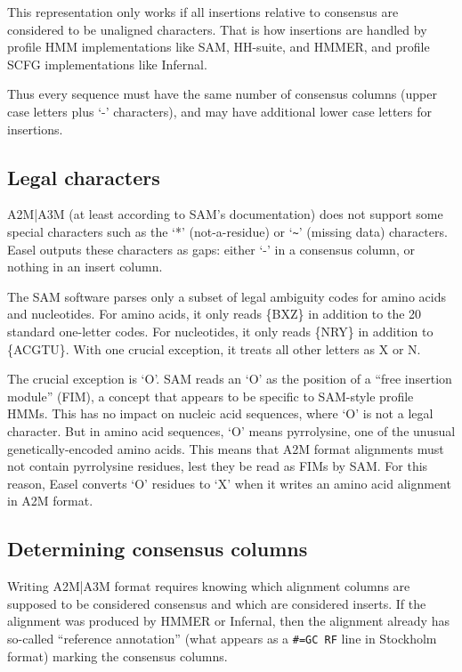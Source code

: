 This representation only works if all insertions relative to consensus
are considered to be unaligned characters. That is how insertions are
handled by profile HMM implementations like SAM, HH-suite, and HMMER,
and profile SCFG implementations like Infernal.

Thus every sequence must have the same number of consensus columns
(upper case letters plus `-' characters), and may have additional lower
case letters for insertions.

\subsection{Legal characters}

A2M|A3M (at least according to SAM's documentation) does not support
some special characters such as the `*' (not-a-residue) or `\verb+~+'
(missing data) characters. Easel outputs these characters as gaps:
either `-' in a consensus column, or nothing in an insert column.

The SAM software parses only a subset of legal ambiguity codes for
amino acids and nucleotides. For amino acids, it only reads \{BXZ\} in
addition to the 20 standard one-letter codes. For nucleotides, it only
reads \{NRY\} in addition to \{ACGTU\}. With one crucial exception, it
treats all other letters as X or N. 

The crucial exception is `O'. SAM reads an `O' as the position of a
``free insertion module'' (FIM), a concept that appears to be specific
to SAM-style profile HMMs. This has no impact on nucleic acid
sequences, where `O' is not a legal character. But in amino acid
sequences, `O' means pyrrolysine, one of the unusual
genetically-encoded amino acids.  This means that A2M format
alignments must not contain pyrrolysine residues, lest they be read as
FIMs by SAM. For this reason, Easel converts `O' residues to `X' when
it writes an amino acid alignment in A2M format.

\subsection{Determining consensus columns}

Writing A2M|A3M format requires knowing which alignment columns are
supposed to be considered consensus and which are considered
inserts. If the alignment was produced by HMMER or Infernal, then the
alignment already has so-called ``reference annotation'' (what appears
as a \verb+#=GC RF+ line in Stockholm format) marking the consensus
columns.

